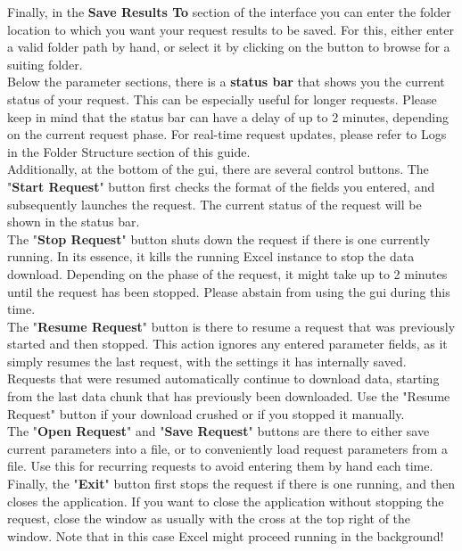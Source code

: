 Finally, in the \textbf{Save Results To} section of the interface you can enter the folder location to which you want your request results to be saved. For this, either enter a valid folder path by hand, or select it by clicking on the button to browse for a suiting folder. \\

Below the parameter sections, there is a \textbf{status bar} that shows you the current status of your request. This can be especially useful for longer requests. Please keep in mind that the status bar can have a delay of up to 2 minutes, depending on the current request phase. For real-time request updates, please refer to Logs in the Folder Structure section of this guide. \\

Additionally, at the bottom of the gui, there are several control buttons. The "\textbf{Start Request}" button first checks the format of the fields you entered, and subsequently launches the request. The current status of the request will be shown in the status bar. \\


The "\textbf{Stop Request}" button shuts down the request if there is one currently running. In its essence, it kills the running Excel instance to stop the data download. Depending on the phase of the request, it might take up to 2 minutes until the request has been stopped. Please abstain from using the gui during this time. \\


The "\textbf{Resume Request}" button is there to resume a request that was previously started and then stopped. This action ignores any entered parameter fields, as it simply resumes the last request, with the settings it has internally saved. Requests that were resumed automatically continue to download data, starting from the last data chunk that has previously been downloaded. Use the "Resume Request" button if your download crushed or if you stopped it manually. \\


The "\textbf{Open Request}" and "\textbf{Save Request}" buttons are there to either save current parameters into a file, or to conveniently load request parameters from a file. Use this for recurring requests to avoid entering them by hand each time. \\


Finally, the "\textbf{Exit}" button first stops the request if there is one running, and then closes the application. If you want to close the application without stopping the request, close the window as usually with the cross at the top right of the window. Note that in this case Excel might proceed running in the background!

